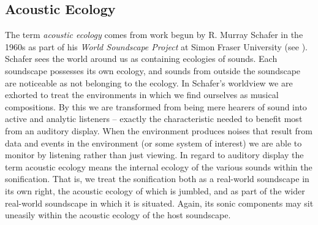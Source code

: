 \documentclass[runningheads]{llncs}
\begin{document}
\subsection{Acoustic Ecology}
The term \emph{acoustic ecology} \cite{Wrightson:2000} comes from work begun by R. Murray Schafer in the 1960s as part of his \emph{World Soundscape Project} at Simon Fraser University (see \cite{Schafer:1977}). Schafer sees the world around us as containing ecologies of sounds. Each soundscape possesses its own ecology, and sounds from outside the soundscape are noticeable as not belonging to the ecology. In Schafer's worldview we are exhorted to treat the environments in which we find ourselves as musical compositions. By this we are transformed from being mere hearers of sound into active and analytic listeners -- exactly the characteristic needed to benefit most from an auditory display. When the environment produces noises that result from data and events in the environment (or some system of interest) we are able to monitor by listening rather than just viewing. In regard to auditory display the term acoustic ecology means the internal ecology of the various sounds within the sonification. That is, we treat the sonification both as a real-world soundscape in its own right, the acoustic ecology of which is jumbled, and as part of the wider real-world soundscape in which it is situated. Again, its sonic components may sit uneasily within the acoustic ecology of the host soundscape.
\end{document}
